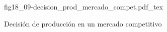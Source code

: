 \begin{figure}[h]
\centering
\def\svgwidth{0.5\textwidth}
{fig18_09-decision_prod_mercado_compet.pdf_tex}
\caption{Decisión de producción en un mercado competitivo}
\label{fig18_09-decision_prod_mercado_compet}
\end{figure}